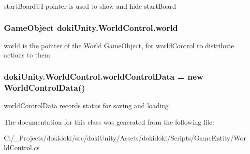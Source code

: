 start\+Board\+UI pointer is used to show and hide start\+Board 

\subsubsection[{\texorpdfstring{world}{world}}]{\setlength{\rightskip}{0pt plus 5cm}Game\+Object doki\+Unity.\+World\+Control.\+world}\hypertarget{classdoki_unity_1_1_world_control_ad0c8093d2369420fe7a2945685569943}{}\label{classdoki_unity_1_1_world_control_ad0c8093d2369420fe7a2945685569943}


world is the pointer of the \hyperlink{classdoki_unity_1_1_world}{World} Game\+Object, for world\+Control to distribute actions to them 

\subsubsection[{\texorpdfstring{world\+Control\+Data}{worldControlData}}]{ doki\+Unity.\+World\+Control.\+world\+Control\+Data = new {\bf World\+Control\+Data}()}\hypertarget{classdoki_unity_1_1_world_control_ae4d88d77b7d39fb0dda5ffa4dbf2e2af}{}\label{classdoki_unity_1_1_world_control_ae4d88d77b7d39fb0dda5ffa4dbf2e2af}


world\+Control\+Data records status for saving and loading 



The documentation for this class was generated from the following file\+:\begin{DoxyCompactItemize}
\item 
C\+:/\+\_\+\+Projects/dokidoki/src/doki\+Unity/\+Assets/dokidoki/\+Scripts/\+Game\+Entity/World\+Control.\+cs\end{DoxyCompactItemize}
